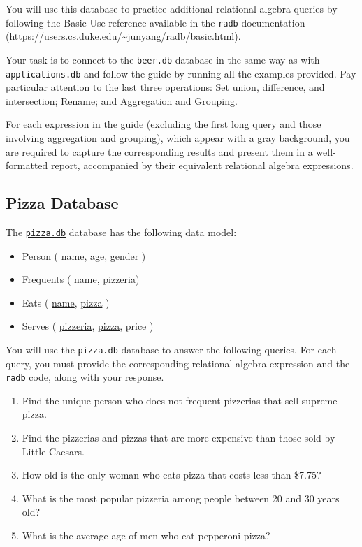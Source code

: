 \documentclass{article}
\begin{document}
You will use this database to practice additional relational algebra queries by following the Basic Use reference available in the \texttt{radb} documentation (\url{https://users.cs.duke.edu/~junyang/radb/basic.html}).

Your task is to connect to the \texttt{beer.db} database in the same way as with \texttt{applications.db} and follow the guide by running all the examples provided. Pay particular attention to the last three operations: Set union, difference, and intersection; Rename; and Aggregation and Grouping.

For each expression in the guide (excluding the first long query and those involving aggregation and grouping), which appear with a gray background, you are required to capture the corresponding results and present them in a well-formatted report, accompanied by their equivalent relational algebra expressions.

\subsection{Pizza Database}\label{sec:pizza}
The \href{https://www.cs.ucr.edu/~acald013/public/Javeriana/DBS/pizza.db}{\texttt{pizza.db}} database has the following data model:

\begin{itemize}
  \item Person ( \underline{name}, age, gender )
  \item Frequents ( \underline{name}, \underline{pizzeria})
  \item Eats ( \underline{name}, \underline{pizza} )
  \item Serves ( \underline{pizzeria}, \underline{pizza}, price )
\end{itemize}

You will use the \texttt{pizza.db} database to answer the following queries. For each query, you must provide the corresponding relational algebra expression and the \texttt{radb} code, along with your response.

\begin{enumerate}
  \item Find the unique person who does not frequent pizzerias that sell supreme pizza.

  \item Find the pizzerias and pizzas that are more expensive than those sold by Little Caesars.

  \item How old is the only woman who eats pizza that costs less than \$7.75?

  \item What is the most popular pizzeria among people between 20 and 30 years old?

  \item What is the average age of men who eat pepperoni pizza?
\end{enumerate}
\end{document}
